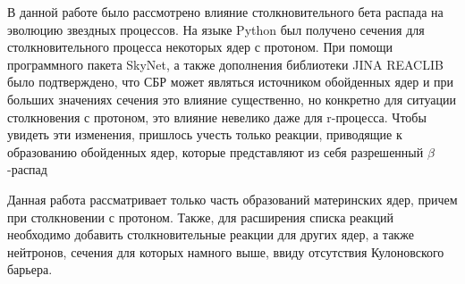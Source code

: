\documentclass[%
master,    %
natbib,      %
subf,        %
href,        %
colorlinks,  %
]{disser}
\begin{document}
В данной работе было рассмотрено влияние столкновительного бета распада на эволюцию звездных процессов. На языке Python был получено сечения для столкновительного процесса некоторых ядер с протоном. При помощи программного пакета SkyNet, а также дополнения библиотеки JINA REACLIB было подтверждено, что СБР может являться источником обойденных ядер и при больших значениях сечения это влияние существенно, но конкретно для ситуации столкновения с протоном, это влияние невелико даже для r-процесса. Чтобы увидеть эти изменения, пришлось учесть только реакции, приводящие к образованию обойденных ядер, которые представляют из себя разрешенный $\beta$-распад

Данная работа рассматривает только часть образований материнских ядер, причем при столкновении с протоном. Также, для расширения списка реакций необходимо добавить столкновительные реакции для других ядер, а также нейтронов, сечения для которых намного выше, ввиду отсутствия Кулоновского барьера.



\end{document}
